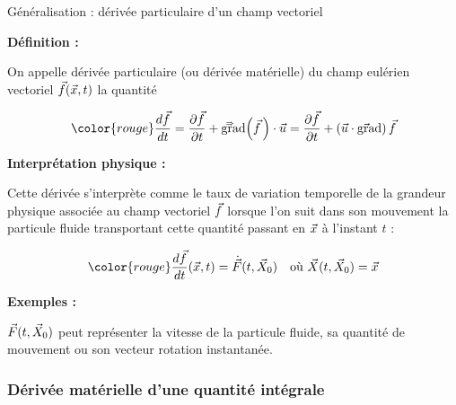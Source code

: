 \begin{frame}{Généralisation : dérivée particulaire d'un champ vectoriel}

\small

\textbf{Définition :} \medskip

On appelle \textcolor{vert}{dérivée particulaire} (ou dérivée matérielle) 
du champ eulérien vectoriel $\vec{f}(\vec{x}, t)$ la quantité

\[
	\color{rouge}
	\ddt{\myvec{f}} 
		=
	\dpdt{\myvec{f}} + \ggradient \left ( \myvec{f} \, \right ) \cdot \myvec{u} 
	=
	\dpdt{\myvec{f}} + \left( \myvec{u} \cdot \gradient \right ) \myvec{f} 

\]


\bigskip

\textbf{Interprétation physique :} \medskip

Cette dérivée s'interprète comme le taux de variation temporelle de la grandeur physique associée au champ vectoriel $\vec{f}$ lorsque l'on suit dans son mouvement la particule fluide transportant cette quantité passant en $\vec{x}$ à l'instant $t$ :

\[
	{\color{rouge}
	\ddt{\myvec{f}}(\myvec{x},t) = \dot{\myvec{F}}(t, \myvec{X}_0)}
	\quad \mbox{où $\myvec{X}(t, \myvec{X}_0) = \myvec{x}$} 
\]

\textbf{Exemples :} \medskip

$\vec{F}(t, \vec{X}_0)$ peut représenter la vitesse de la particule fluide, 
sa quantité de mouvement ou son vecteur rotation instantanée.

\vspace{10mm}

\end{frame}




\subsubsection{Dérivée matérielle d'une quantité intégrale}

%
%
%
%
%


